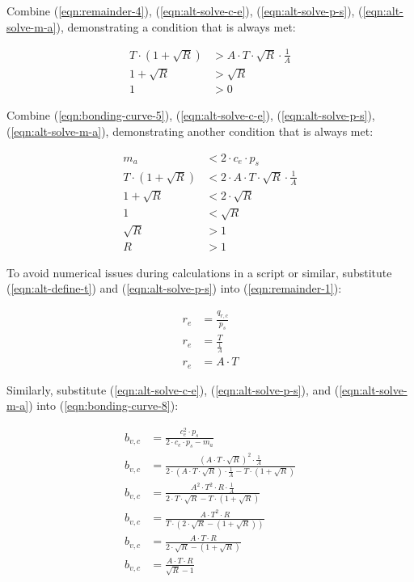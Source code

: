 \documentclass[table, twocolumn]{article}
\begin{document}
Combine (\ref{eqn:remainder-4}), (\ref{eqn:alt-solve-c-e}), (\ref{eqn:alt-solve-p-s}),
(\ref{eqn:alt-solve-m-a}), demonstrating a condition that is always met:

\begin{align}
  T \cdot (1 + \sqrt{R}) & > A \cdot T \cdot \sqrt{R} \cdot \frac{1}{A} \nonumber \\
  1 + \sqrt{R}           & > \sqrt{R}  \nonumber                                  \\
  1                      & > 0
\end{align}

Combine (\ref{eqn:bonding-curve-5}), (\ref{eqn:alt-solve-c-e}),
(\ref{eqn:alt-solve-p-s}), (\ref{eqn:alt-solve-m-a}), demonstrating another condition
that is always met:

\begin{align}
  m_a                    & < 2 \cdot c_e \cdot p_s \nonumber   \\
  T \cdot (1 + \sqrt{R}) & <
  2 \cdot A \cdot T \cdot \sqrt{R} \cdot \frac{1}{A} \nonumber \\
  1 + \sqrt{R}           & < 2 \cdot \sqrt{R} \nonumber        \\
  1                      & < \sqrt{R} \nonumber                \\
  \sqrt{R}               & > 1 \nonumber                       \\
  R                      & > 1
\end{align}

To avoid numerical issues during calculations in a script or similar, substitute
(\ref{eqn:alt-define-t}) and (\ref{eqn:alt-solve-p-s}) into (\ref{eqn:remainder-1}):

\begin{align}
  r_e & = \frac{q_{r, c}}{p_s} \nonumber  \\
  r_e & = \frac{T}{\frac{1}{A}} \nonumber \\
  r_e & = A \cdot T
\end{align}

Similarly, substitute (\ref{eqn:alt-solve-c-e}), (\ref{eqn:alt-solve-p-s}), and
(\ref{eqn:alt-solve-m-a}) into (\ref{eqn:bonding-curve-8}):

\begin{align}
  b_{v, c} & = \frac{c_e ^ 2 \cdot p_s}{2 \cdot c_e \cdot p_s - m_a} \nonumber       \\
  b_{v, c} & =
  \frac{(A \cdot T \cdot \sqrt{R}) ^ 2 \cdot \frac{1}{A}}
  {2 \cdot (A \cdot T \cdot \sqrt{R}) \cdot
  \frac{1}{A} - T \cdot (1 + \sqrt{R})} \nonumber                                    \\
  b_{v, c} & = \frac{A^2 \cdot T^2 \cdot R \cdot \frac{1}{A}}
  {2 \cdot T \cdot \sqrt{R} - T \cdot (1 + \sqrt{R})} \nonumber                      \\
  b_{v, c} & = \frac{A \cdot T^2 \cdot R}
  {T \cdot(2 \cdot \sqrt{R} - (1 + \sqrt{R}))} \nonumber                             \\
  b_{v, c} & = \frac{A \cdot T \cdot R}{2 \cdot \sqrt{R} - (1 + \sqrt{R})} \nonumber \\
  b_{v, c} & = \frac{A \cdot T \cdot R}{\sqrt{R} - 1}
\end{align}
\end{document}
